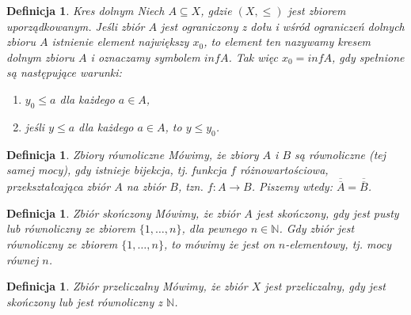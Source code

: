 \documentclass[12pt,a4paper]{report}
\newtheorem{definition}[theorem]{Definicja}
\newcommand{\licznosc}[1]{\overline{\overline{#1}}}
\begin{document}
\begin{definition}{Kres dolnym \cite[Rozdział 2]{blaszczyk2007}}
Niech $A \subseteq X$, gdzie $(X, \leq)$ jest zbiorem uporządkowanym. Jeśli zbiór $A$ jest ograniczony z dołu i wśród ograniczeń dolnych zbioru $A$ istnienie element największy $x_0$, to element ten nazywamy kresem dolnym zbioru $A$ i oznaczamy symbolem $inf A$. Tak więc $x_0 =inf A$, gdy spełnione są następujące warunki:
\begin{enumerate}
\item $y_0 \leq a$ dla każdego $a \in A$,
\item jeśli $y \leq a$ dla każdego $a \in A$, to $y \leq y_0$.
\end{enumerate}
\end{definition}


\begin{definition}{Zbiory równoliczne \cite[Rozdział 5]{blaszczyk2007}}
Mówimy, że zbiory $A$ i $B$ są równoliczne (tej samej mocy), gdy istnieje bijekcja, tj. funkcja $f$ różnowartościowa, przekształcająca zbiór $A$ na zbiór $B$, tzn. $f: A \rightarrow B$. Piszemy wtedy:  $\licznosc{A}=\licznosc{B}$.
\end{definition}


\begin{definition}{Zbiór skończony \cite[Rozdział 5]{blaszczyk2007}}
Mówimy, że zbiór $A$ jest skończony, gdy jest pusty lub równoliczny ze zbiorem $\{1, \ldots, n \}$, dla pewnego $n \in \mathbb{N}$. Gdy zbiór jest równoliczny ze zbiorem $\{1, \ldots, n\}$, to mówimy że jest on $n$-elementowy, tj. mocy równej $n$.
\end{definition}


\begin{definition}{Zbiór przeliczalny \cite[Rozdział 5]{blaszczyk2007}}
Mówimy, że zbiór $X$ jest przeliczalny, gdy jest skończony lub jest równoliczny z $\mathbb{N}$.
\end{definition}


\end{document}
